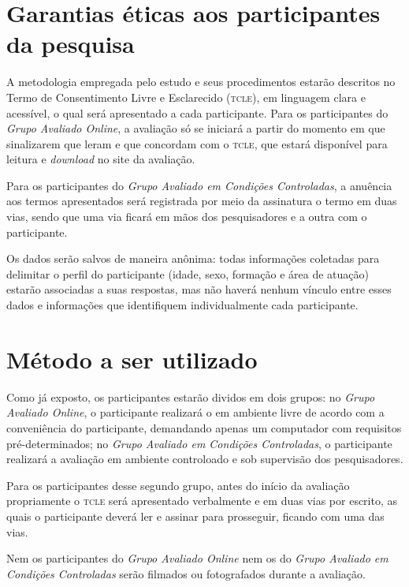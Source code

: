 \documentclass[a4paper,11pt,titlepage,singlespacing]{article}
\begin{document}
\section{Garantias éticas aos participantes da pesquisa}
\noindent A metodologia empregada pelo estudo e seus procedimentos estarão descritos no Termo de Consentimento Livre e Esclarecido (\textsc{tcle}), em linguagem clara e acessível, o qual será apresentado a cada participante. Para os participantes do \textit{Grupo Avaliado Online}, a avaliação só se iniciará a partir do momento em que sinalizarem que leram e que concordam com o \textsc{tcle}, que estará disponível para leitura e \textit{download} no site da avaliação. 

Para os participantes do \textit{Grupo Avaliado em Condições Controladas}, a anuência aos termos apresentados será registrada por meio da assinatura o termo em duas vias, sendo que uma via ficará em mãos dos pesquisadores e a outra com o participante.

Os dados serão salvos de maneira anônima: todas informações coletadas para delimitar o perfil do participante (idade, sexo, formação e área de atuação) estarão associadas a suas respostas, mas não haverá nenhum vínculo entre esses dados e informações que identifiquem individualmente cada participante.



\section{Método a ser utilizado}

\noindent Como já exposto, os participantes estarão dividos em dois grupos: no \textit{Grupo Avaliado Online}, o participante realizará o em ambiente livre de acordo com a conveniência do participante, demandando apenas um computador com requisitos pré-determinados; no \textit{Grupo Avaliado em Condições Controladas}, o participante realizará a avaliação em ambiente controloado e sob supervisão dos pesquisadores.

Para os participantes desse segundo grupo, antes do início da avaliação propriamente o \textsc{tcle} será apresentado verbalmente e em duas vias por escrito, as quais o participante deverá ler e assinar para prosseguir, ficando com uma das vias.

Nem os participantes do \textit{Grupo Avaliado Online} nem os do \textit{Grupo Avaliado em Condições Controladas} serão filmados ou fotografados durante a avaliação.
\end{document}
